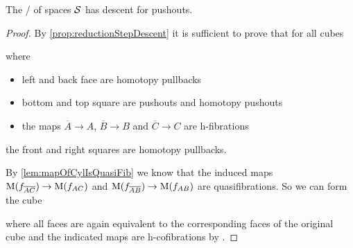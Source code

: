 \begin{prop}
    The \inftycat/ of spaces $\mathcal{S}$ has descent for pushouts. 
    \begin{proof}
        By \cref{prop:reductionStepDescent} it is sufficient to prove that for all cubes 
        \begin{center}
        \end{center}
        where 
        \begin{itemize}
            \item left and back face are homotopy pullbacks
            \item bottom and top square are pushouts and homotopy pushouts
            \item the maps $\overline{A}\to A$, $\overline{B}\to B$ and $\overline{C}\to C$ are h-fibrations
        \end{itemize}
        the front and right squares are homotopy pullbacks.

        By \cref{lem:mapOfCylIsQuasiFib} we know that the induced maps $\operatorname{M}(f_{\overline{A}\overline{C}})\to\operatorname{M}(f_{AC})$ and $\operatorname{M}(f_{\overline{A}\overline{B}})\to\operatorname{M}(f_{AB})$ are quasifibrations.
        So we can form the cube 
        \begin{center}
        \end{center}
        where all faces are again equivalent to the corresponding faces of the original cube and the indicated maps are h-cofibrations by %
        .
        

\end{proof}
\end{prop}
